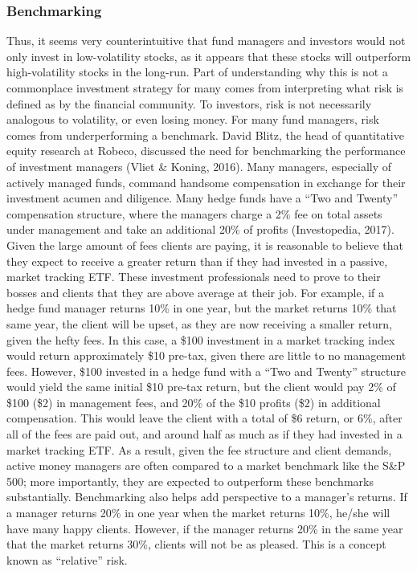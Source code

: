 \documentclass[12pt,twoside]{reedthesis}
\theoremstyle{definition}
\theoremstyle{definition}
\theoremstyle{definition}
\theoremstyle{remark}
\begin{document}
\subsubsection{Benchmarking}\label{benchmarking}

Thus, it seems very counterintuitive that fund managers and investors
would not only invest in low-volatility stocks, as it appears that these
stocks will outperform high-volatility stocks in the long-run. Part of
understanding why this is not a commonplace investment strategy for many
comes from interpreting what risk is defined as by the financial
community. To investors, risk is not necessarily analogous to
volatility, or even losing money. For many fund managers, risk comes
from underperforming a benchmark. David Blitz, the head of quantitative
equity research at Robeco, discussed the need for benchmarking the
performance of investment managers (Vliet \& Koning, 2016). Many
managers, especially of actively managed funds, command handsome
compensation in exchange for their investment acumen and diligence. Many
hedge funds have a ``Two and Twenty'' compensation structure, where the
managers charge a 2\% fee on total assets under management and take an
additional 20\% of profits (Investopedia, 2017). Given the large amount
of fees clients are paying, it is reasonable to believe that they expect
to receive a greater return than if they had invested in a passive,
market tracking ETF. These investment professionals need to prove to
their bosses and clients that they are above average at their job. For
example, if a hedge fund manager returns 10\% in one year, but the
market returns 10\% that same year, the client will be upset, as they
are now receiving a smaller return, given the hefty fees. In this case,
a \$100 investment in a market tracking index would return approximately
\$10 pre-tax, given there are little to no management fees. However,
\$100 invested in a hedge fund with a ``Two and Twenty'' structure would
yield the same initial \$10 pre-tax return, but the client would pay 2\%
of \$100 (\$2) in management fees, and 20\% of the \$10 profits (\$2) in
additional compensation. This would leave the client with a total of \$6
return, or 6\%, after all of the fees are paid out, and around half as
much as if they had invested in a market tracking ETF. As a result,
given the fee structure and client demands, active money managers are
often compared to a market benchmark like the S\&P 500; more
importantly, they are expected to outperform these benchmarks
substantially. Benchmarking also helps add perspective to a manager's
returns. If a manager returns 20\% in one year when the market returns
10\%, he/she will have many happy clients. However, if the manager
returns 20\% in the same year that the market returns 30\%, clients will
not be as pleased. This is a concept known as ``relative'' risk.
\end{document}
